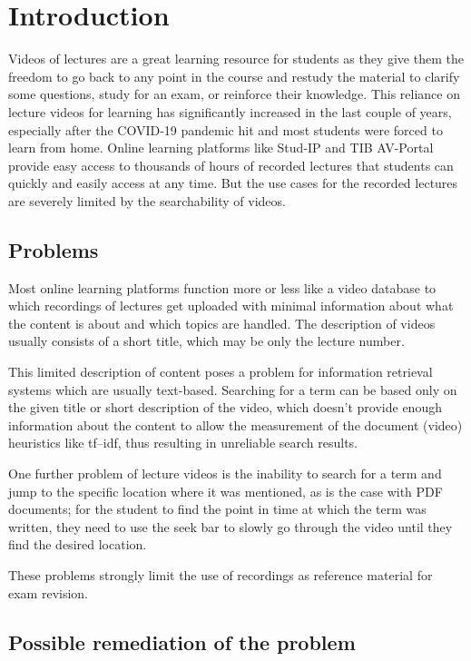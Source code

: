 
\chapter{Introduction}
\label{ch:intro}

Videos of lectures are a great learning resource for students as they give them the freedom to go back to any point in the course and restudy the material to clarify some questions, study for an exam, or reinforce their knowledge.
This reliance on lecture videos for learning has significantly increased in the last couple of years, especially after the COVID-19 pandemic hit and most students were forced to learn from home.
Online learning platforms like Stud-IP and TIB AV-Portal provide easy access to thousands of hours of recorded lectures that students can quickly and easily access at any time.
But the use cases for the recorded lectures are severely limited by the searchability of videos.

\section{Problems}
Most online learning platforms function more or less like a video database to which recordings of lectures get uploaded with minimal information about what the content is about and which topics are handled. The description of videos usually consists of a short title, which may be only the lecture number.

This limited description of content poses a problem for information retrieval systems which are usually text-based. Searching for a term can be based only on the given title or short description of the video, which doesn't provide enough information about the content to allow the measurement of the document (video) heuristics like \gls{tf–idf}, thus resulting in unreliable search results.

One further problem of lecture videos is the inability to search for a term and jump to the specific location where it was mentioned, as is the case with PDF documents; for the student to find the point in time at which the term was written, they need to use the seek bar to slowly go through the video until they find the desired location.

These problems strongly limit the use of recordings as reference material for exam revision.

\section{Possible remediation of the problem}

